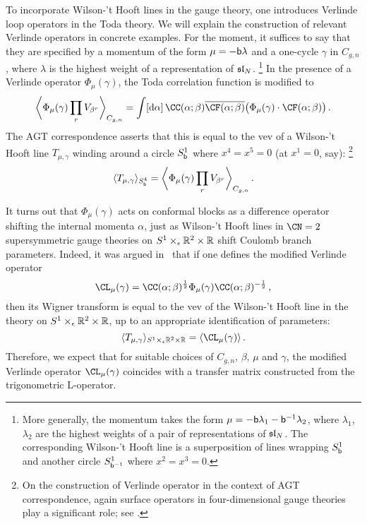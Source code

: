 To incorporate Wilson-'t Hooft lines in the gauge theory, one
introduces Verlinde loop operators \cite{Verlinde:1988sn} in the Toda theory.  We will
explain the construction of relevant Verlinde operators in concrete
examples.  For the moment, it suffices to say that they are specified
by a momentum of the form $\mu = -\mathsf{b}\lambda$ and a one-cycle $\gamma$
in $C_{g,n}$, where $\lambda$ is the highest weight of a
representation of $\mathfrak{sl}_N$.%
%
\footnote{More generally, the momentum takes the form
  $\mu = -\mathsf{b}\lambda_1 - \mathsf{b}^{-1} \lambda_2$, where $\lambda_1$,
  $\lambda_2$ are the highest weights of a pair of representations of
  $\mathfrak{sl}_N$.  The corresponding Wilson-'t Hooft line is a
  superposition of lines wrapping $S^1_{\mathsf{b}}$ and another circle
  $S^1_{\mathsf{b}^{-1}}$ where $x^2 = x^3 = 0$.}
%
In the presence of a Verlinde operator $\Phi_\mu(\gamma)$, the Toda
correlation function is modified to
\begin{equation}
  \biggvev{\Phi_\mu(\gamma) \prod_r V_{\beta^r}}_{C_{g,n}}
  =
  \int [\rmd\alpha] \,
  \CC(\alpha; \beta) \overline{\CF(\alpha; \beta)}
  \bigl(\Phi_\mu(\gamma) \cdot \CF(\alpha; \beta)\bigr) \,.
\end{equation}
The AGT correspondence asserts \cite{Alday:2009fs, Drukker:2009id,Gomis:2010kv}
that this is equal to the vev of a Wilson-'t Hooft line
$T_{\mu,\gamma}$ winding around a circle $S^1_{\mathsf{b}}$ where
$x^4 = x^5 = 0$ (at $x^1 = 0$, say):%
%
\footnote{On the construction of Verlinde operator in the context of
AGT correspondence, again surface operators in four-dimensional gauge theories
play a significant role; see \cite{Alday:2009fs,Gukov:2014gja}.}
%
\begin{equation}
  \langle T_{\mu,\gamma} \rangle_{S^4_{\mathsf{b}}}
  =
  \biggl\langle \Phi_\mu(\gamma) \prod_r V_{\beta^r} \biggr\rangle_{C_{g,n}} \,.
\end{equation}

It turns out that $\Phi_\mu(\gamma)$ acts on conformal blocks as a
difference operator shifting the internal momenta $\alpha$, just as
Wilson-'t Hooft lines in $\CN = 2$ supersymmetric gauge theories on
$S^1 \times_\epsilon \mathbb{R}^2 \times \mathbb{R}$ shift Coulomb branch parameters.  Indeed, it
was argued in~\cite{Ito:2011ea} that if one defines the modified Verlinde
operator
\begin{equation}
  \label{eq:c-verlinde}
  \CL_\mu(\gamma)
  =
  \CC(\alpha; \beta)^{\frac12}
  \Phi_\mu(\gamma) \CC(\alpha; \beta)^{-\frac12} \,,
\end{equation}
then its Wigner transform is equal to the vev of the Wilson-'t Hooft
line in the theory on $S^1 \times_\epsilon \mathbb{R}^2 \times \mathbb{R}$, up to an appropriate
identification of parameters:
\begin{equation}
  \vev{T_{\mu,\gamma}}_{S^1 \times_\eps \R^2 \times \R}
  =
  \vev{\CL_\mu(\gamma)} \,.
\end{equation}
Therefore, we expect that for suitable choices of $C_{g,n}$, $\beta$,
$\mu$ and $\gamma$, the modified Verlinde operator $\CL_\mu(\gamma)$
coincides with a transfer matrix constructed from the trigonometric
L-operator.




